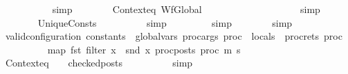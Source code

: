\begin{isabellebody}
\ \ \ \ \ \ \ \ \ \isamarkupfalse%
\ simp\isanewline
\ \ \ \ \ \ \isamarkupfalse%
\ Contexteq\ WfGlobal\ {\isacartoucheopen}{\isasymOmega}\ {\isacharequal}{\kern0pt}\ {\isacharbrackleft}{\kern0pt}{\isacharbrackright}{\kern0pt}{\isacartoucheclose}\ \ \ \ \ \ \isanewline
\ \ \ \ \ \ \ \ \ \isamarkupfalse%
\ simp\isanewline
\ \ \ \ \ \ \isamarkupfalse%
\ UniqueConsts\isanewline
\ \ \ \ \ \ \ \ \isamarkupfalse%
\ simp\isanewline
\ \ \ \ \ \ \ \isamarkupfalse%
\ simp\isanewline
\ \ \ \ \ \ \isamarkupfalse%
\ simp\isanewline
\ \ \ \ \ \ \isamarkupfalse%
\isanewline
\ \ \ \ \isamarkupfalse%
\ {\isachardoublequoteopen}valid{\isacharunderscore}{\kern0pt}configuration\ {\isacharparenleft}{\kern0pt}constants\ {\isacharat}{\kern0pt}\ global{\isacharunderscore}{\kern0pt}vars{\isacharcomma}{\kern0pt}\ proc{\isacharunderscore}{\kern0pt}args\ proc\ {\isacharat}{\kern0pt}\ locals\ {\isacharat}{\kern0pt}\ proc{\isacharunderscore}{\kern0pt}rets\ proc{\isacharparenright}{\kern0pt}\ {\isasymGamma}\ {\isasymOmega}\isanewline
\ \ \ \ \ \ \ \ {\isacharparenleft}{\kern0pt}map\ fst\ {\isacharparenleft}{\kern0pt}filter\ {\isacharparenleft}{\kern0pt}{\isasymlambda}x{\isachardot}{\kern0pt}\ {\isasymnot}\ snd\ x{\isacharparenright}{\kern0pt}\ {\isacharparenleft}{\kern0pt}proc{\isacharunderscore}{\kern0pt}posts\ proc{\isacharparenright}{\kern0pt}{\isacharparenright}{\kern0pt}{\isacharparenright}{\kern0pt}\ m{\isacharprime}{\kern0pt}\ s{\isacharprime}{\kern0pt}{\isachardoublequoteclose}\isanewline
\ \ \ \ \ \ \isamarkupfalse%
\ Contexteq\ {\isacartoucheopen}{\isasymOmega}\ {\isacharequal}{\kern0pt}\ {\isacharbrackleft}{\kern0pt}{\isacharbrackright}{\kern0pt}{\isacartoucheclose}\ {\isacartoucheopen}checked{\isacharunderscore}{\kern0pt}posts\ {\isacharequal}{\kern0pt}\ {\isacharunderscore}{\kern0pt}{\isacartoucheclose}\isanewline
\ \ \ \ \ \ \isamarkupfalse%
\ simp\isanewline
\ \ \isamarkupfalse%
\isanewline
{}\isamarkupfalse%
%
\endisatagproof
{\isafoldproof}%
%
\isadelimproof
\isanewline
%
\endisadelimproof
\isanewline
\isanewline
{}\isamarkupfalse%
\isanewline
%
\isadelimtheory
\isanewline
%
\endisadelimtheory
%
\isatagtheory
{}\isamarkupfalse%
%
\endisatagtheory
{\isafoldtheory}%
%
\isadelimtheory
%
\endisadelimtheory
%
\end{isabellebody}%
\endinput
